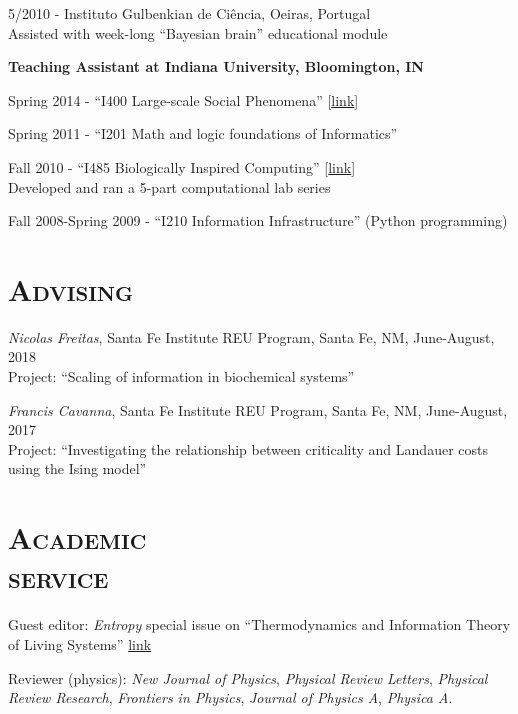 \documentclass[margin,line,centered]{res}
\begin{document}
\begin{resume}
5/2010 - Instituto Gulbenkian de Ciência, Oeiras, Portugal\\
Assisted with week-long ``Bayesian brain'' educational module

\vspace{5pt}

\textbf{Teaching Assistant at Indiana University, Bloomington, IN}

Spring 2014 - ``I400 Large-scale Social Phenomena'' {[}\href{http://tuvalu.santafe.edu/~simon/page11/page11.html}{link}{]} 

Spring 2011 - ``I201 Math and logic foundations of Informatics''

Fall 2010 - ``I485 Biologically Inspired Computing'' {[}\href{https://web.archive.org/web/20110310071102/http://www.informatics.indiana.edu/rocha/i-bic/index.html}{link}{]}\\
Developed and ran a 5-part computational lab series

Fall 2008-Spring 2009 - ``I210 Information Infrastructure'' (Python programming)



\section{\textsc{Advising}}
\emph{Nicolas Freitas}, Santa Fe Institute REU Program, Santa Fe, NM, June-August, 2018 \\
Project: ``Scaling of information in biochemical systems''

\emph{Francis Cavanna}, Santa Fe Institute REU Program, Santa Fe, NM, June-August, 2017 \\
Project: ``Investigating the relationship between criticality and Landauer costs using the Ising model''

\section{\textsc{Academic\\service}}

{Guest editor}: \emph{Entropy} special issue on ``Thermodynamics and Information Theory of Living Systems'' \href{https://www.mdpi.com/journal/entropy/special_issues/thermodynamics_living_systems}{link}

{Reviewer} (physics): \emph{New Journal of Physics}, \emph{Physical Review Letters}, \emph{Physical Review Research}, \emph{Frontiers in Physics}, \emph{Journal of Physics A}, \emph{Physica A}.


\end{resume}
\end{document}
